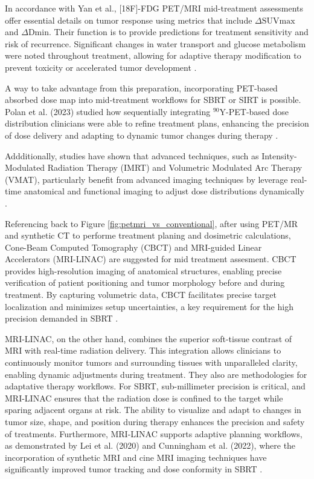 \begin{multicols}{2}
In accordance with Yan et al., [18F]-FDG PET/MRI mid-treatment assessments offer essential details on tumor response using metrics that include $\Delta \text{SUVmax}$ and $\Delta \text{Dmin}$. Their function is to provide predictions for treatment sensitivity and risk of recurrence. Significant changes in water transport and glucose metabolism were noted throughout treatment, allowing for adaptive therapy modification to prevent toxicity or accelerated tumor development \cite{yan2024}.  

A way to take advantage from this preparation, incorporating PET-based absorbed dose map into mid-treatment workflows for SBRT or SIRT is possible. Polan et al. (2023) studied how sequentially integrating $^{90}\text{Y}$-PET-based dose distribution clinicians were able to refine treatment plans, enhancing the precision of dose delivery and adapting to dynamic tumor changes during therapy \cite{Polan2023}. 

Addditionally, studies have shown that  advanced techniques, such as Intensity-Modulated Radiation Therapy (IMRT) and Volumetric Modulated Arc Therapy (VMAT), particularly benefit from advanced imaging techniques by leverage real-time anatomical and functional imaging to adjust dose distributions dynamically \cite{Hunte2022,Tsang2016}.

Referencing back to Figure \ref{fig:petmri_vs_conventional}, after using PET/MR and synthetic CT to performe treatment planing and dosimetric calculations, Cone-Beam Computed Tomography (CBCT) and MRI-guided Linear Accelerators (MRI-LINAC) are suggested for mid treatment assesment. CBCT provides high-resolution imaging of anatomical structures, enabling precise verification of patient positioning and tumor morphology before and during treatment. By capturing volumetric data, CBCT facilitates precise target localization and minimizes setup uncertainties, a key requirement for the high precision demanded in SBRT \cite{Srinivasan2014}.

MRI-LINAC, on the other hand, combines the superior soft-tissue contrast of MRI with real-time radiation delivery. This integration allows clinicians to continuously monitor tumors and surrounding tissues with unparalleled clarity, enabling dynamic adjustments during treatment. They also are methodologies for adaptative therapy workflows. For SBRT, sub-millimeter precision is critical,  and MRI-LINAC ensures that the radiation dose is confined to the target while sparing adjacent organs at risk. The ability to visualize and adapt to changes in tumor size, shape, and position during therapy enhances the precision and safety of treatments. Furthermore, MRI-LINAC supports adaptive planning workflows, as demonstrated by Lei et al. (2020) and Cunningham et al. (2022), where the incorporation of synthetic MRI and cine MRI imaging techniques have significantly improved tumor tracking and dose conformity in SBRT \cite{Lei2020,Cunningham2022}.
\end{multicols}